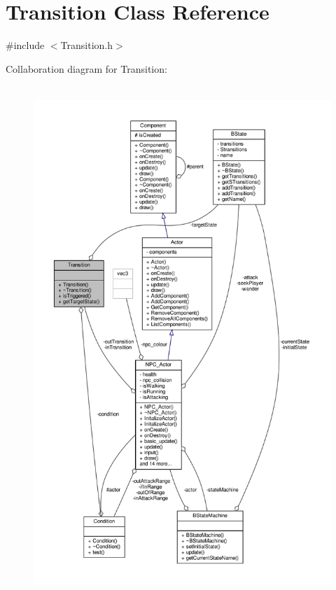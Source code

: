\hypertarget{classTransition}{}\section{Transition Class Reference}
\label{classTransition}


{\ttfamily \#include $<$Transition.\+h$>$}



Collaboration diagram for Transition\+:
\nopagebreak
\begin{figure}[H]
\begin{center}
\leavevmode
\includegraphics[height=550pt]{classTransition__coll__graph}
\end{center}
\end{figure}
